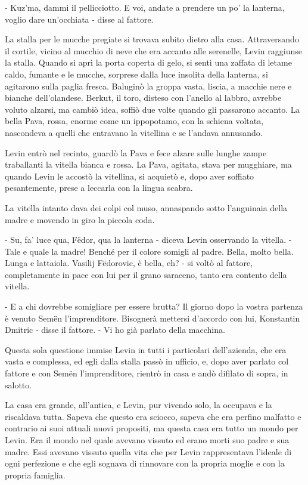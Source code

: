 - Kuz'ma, dammi il pellicciotto. E voi, andate a prendere un po' la lanterna, voglio dare un'occhiata - disse al fattore. 

La stalla per le mucche pregiate si trovava subito dietro alla casa. Attraversando il cortile, vicino al mucchio di neve che era accanto alle serenelle, Levin raggiunse la stalla. Quando si aprì la porta coperta di gelo, si sentì una zaffata di letame caldo, fumante e le mucche, sorprese dalla luce insolita della lanterna, si agitarono sulla paglia fresca. Baluginò la groppa vasta, liscia, a macchie nere e bianche dell'olandese. Berkut, il toro, disteso con l'anello al labbro, avrebbe voluto alzarsi, ma cambiò idea, soffiò due volte quando gli passarono accanto. La bella Pava, rossa, enorme come un ippopotamo, con la schiena voltata, nascondeva a quelli che entravano la vitellina e se l'andava annusando. 

Levin entrò nel recinto, guardò la Pava e fece alzare sulle lunghe zampe traballanti la vitella bianca e rossa. La Pava, agitata, stava per mugghiare, ma quando Levin le accostò la vitellina, si acquietò e, dopo aver soffiato pesantemente, prese a leccarla con la lingua scabra. 

La vitella intanto dava dei colpi col muso, annaspando sotto l'anguinaia della madre e movendo in giro la piccola coda. 

- Su, fa' luce qua, Fëdor, qua la lanterna - diceva Levin osservando la vitella. - Tale e quale la madre! Benché per il colore somigli al padre. Bella, molto bella. Lunga e lattaiola. Vasilij Fëdorovic, è bella, eh? - si voltò al fattore, completamente in pace con lui per il grano saraceno, tanto era contento della vitella. 

- E a chi dovrebbe somigliare per essere brutta? Il giorno dopo la vostra partenza è venuto Semën l'imprenditore. Bisognerà mettersi d'accordo con lui, Konstantin Dmitric - disse il fattore. - Vi ho già parlato della macchina. 

Questa sola questione immise Levin in tutti i particolari dell'azienda, che era vasta e complessa, ed egli dalla stalla passò in ufficio, e, dopo aver parlato col fattore e con Semën l'imprenditore, rientrò in casa e andò difilato di sopra, in salotto. 

La casa era grande, all'antica, e Levin, pur vivendo solo, la occupava e la riscaldava tutta. Sapeva che questo era sciocco, sapeva che era perfino malfatto e contrario ai suoi attuali nuovi propositi, ma questa casa era tutto un mondo per Levin. Era il mondo nel quale avevano vissuto ed erano morti suo padre e sua madre. Essi avevano vissuto quella vita che per Levin rappresentava l'ideale di ogni perfezione e che egli sognava di rinnovare con la propria moglie e con la propria famiglia. 

